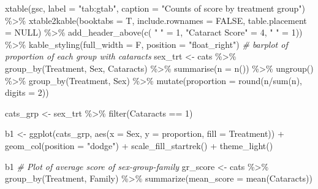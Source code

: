 \documentclass[12pt]{article}
\newenvironment{Shaded}{\begin{snugshade}}{\end{snugshade}}
\newcommand{\AttributeTok}[1]{\textcolor[rgb]{0.77,0.63,0.00}{#1}}
\newcommand{\CommentTok}[1]{\textcolor[rgb]{0.56,0.35,0.01}{\textit{#1}}}
\newcommand{\ConstantTok}[1]{\textcolor[rgb]{0.00,0.00,0.00}{#1}}
\newcommand{\DecValTok}[1]{\textcolor[rgb]{0.00,0.00,0.81}{#1}}
\newcommand{\FunctionTok}[1]{\textcolor[rgb]{0.00,0.00,0.00}{#1}}
\newcommand{\NormalTok}[1]{#1}
\newcommand{\OtherTok}[1]{\textcolor[rgb]{0.56,0.35,0.01}{#1}}
\newcommand{\SpecialCharTok}[1]{\textcolor[rgb]{0.00,0.00,0.00}{#1}}
\newcommand{\StringTok}[1]{\textcolor[rgb]{0.31,0.60,0.02}{#1}}
\begin{document}
\begin{Shaded}
\begin{Highlighting}[]
\FunctionTok{xtable}\NormalTok{(gsc, }\AttributeTok{label =} \StringTok{"tab:gtab"}\NormalTok{, }\AttributeTok{caption =} \StringTok{"Counts of score by treatment group"}\NormalTok{) }\SpecialCharTok{\%\textgreater{}\%}
  \FunctionTok{xtable2kable}\NormalTok{(}\AttributeTok{booktabs =}\NormalTok{ T, }
               \AttributeTok{include.rownames =} \ConstantTok{FALSE}\NormalTok{,}
               \AttributeTok{table.placement =} \ConstantTok{NULL}\NormalTok{) }\SpecialCharTok{\%\textgreater{}\%}
  \FunctionTok{add\_header\_above}\NormalTok{(}\FunctionTok{c}\NormalTok{( }\StringTok{" "} \OtherTok{=} \DecValTok{1}\NormalTok{, }\StringTok{"Cataract Score"} \OtherTok{=} \DecValTok{4}\NormalTok{, }\StringTok{" "} \OtherTok{=} \DecValTok{1}\NormalTok{)) }\SpecialCharTok{\%\textgreater{}\%}
  \FunctionTok{kable\_styling}\NormalTok{(}\AttributeTok{full\_width =}\NormalTok{ F, }\AttributeTok{position =} \StringTok{"float\_right"}\NormalTok{) }
\CommentTok{\# barplot of proportion of each group with cataracts}
\NormalTok{sex\_trt }\OtherTok{\textless{}{-}}\NormalTok{ cats }\SpecialCharTok{\%\textgreater{}\%}
  \FunctionTok{group\_by}\NormalTok{(Treatment, Sex, Cataracts) }\SpecialCharTok{\%\textgreater{}\%}
  \FunctionTok{summarise}\NormalTok{(}\AttributeTok{n =} \FunctionTok{n}\NormalTok{()) }\SpecialCharTok{\%\textgreater{}\%}
  \FunctionTok{ungroup}\NormalTok{() }\SpecialCharTok{\%\textgreater{}\%}
  \FunctionTok{group\_by}\NormalTok{(Treatment, Sex) }\SpecialCharTok{\%\textgreater{}\%}
  \FunctionTok{mutate}\NormalTok{(}\AttributeTok{proportion =} \FunctionTok{round}\NormalTok{(n}\SpecialCharTok{/}\FunctionTok{sum}\NormalTok{(n), }\AttributeTok{digits =} \DecValTok{2}\NormalTok{))}

\NormalTok{cats\_grp }\OtherTok{\textless{}{-}}\NormalTok{ sex\_trt }\SpecialCharTok{\%\textgreater{}\%}
  \FunctionTok{filter}\NormalTok{(Cataracts }\SpecialCharTok{==} \DecValTok{1}\NormalTok{)}

\NormalTok{b1 }\OtherTok{\textless{}{-}} \FunctionTok{ggplot}\NormalTok{(cats\_grp, }\FunctionTok{aes}\NormalTok{(}\AttributeTok{x =}\NormalTok{ Sex, }\AttributeTok{y =}\NormalTok{ proportion, }\AttributeTok{fill =}\NormalTok{ Treatment)) }\SpecialCharTok{+}
  \FunctionTok{geom\_col}\NormalTok{(}\AttributeTok{position =} \StringTok{"dodge"}\NormalTok{) }\SpecialCharTok{+}
  \FunctionTok{scale\_fill\_startrek}\NormalTok{() }\SpecialCharTok{+}
  \FunctionTok{theme\_light}\NormalTok{() }

\NormalTok{b1}
\CommentTok{\# Plot of average score of sex{-}group{-}family}
\NormalTok{gr\_score }\OtherTok{\textless{}{-}}\NormalTok{ cats }\SpecialCharTok{\%\textgreater{}\%}
  \FunctionTok{group\_by}\NormalTok{(Treatment, Family) }\SpecialCharTok{\%\textgreater{}\%}
  \FunctionTok{summarize}\NormalTok{(}\AttributeTok{mean\_score =} \FunctionTok{mean}\NormalTok{(Cataracts))}


\end{Highlighting}
\end{Shaded}
\end{document}

